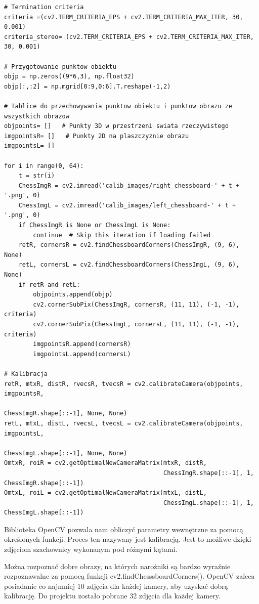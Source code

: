 \documentclass[magisterska]{pracadypl}
\begin{document}
\begin{lstlisting}[style=mypython]
# Termination criteria
criteria =(cv2.TERM_CRITERIA_EPS + cv2.TERM_CRITERIA_MAX_ITER, 30, 0.001)
criteria_stereo= (cv2.TERM_CRITERIA_EPS + cv2.TERM_CRITERIA_MAX_ITER, 30, 0.001)

# Przygotowanie punktow obiektu
objp = np.zeros((9*6,3), np.float32)
objp[:,:2] = np.mgrid[0:9,0:6].T.reshape(-1,2)

# Tablice do przechowywania punktow obiektu i punktow obrazu ze wszystkich obrazow
objpoints= []   # Punkty 3D w przestrzeni swiata rzeczywistego
imgpointsR= []   # Punkty 2D na plaszczyznie obrazu
imgpointsL= []

for i in range(0, 64):
    t = str(i)
    ChessImgR = cv2.imread('calib_images/right_chessboard-' + t + '.png', 0)
    ChessImgL = cv2.imread('calib_images/left_chessboard-' + t + '.png', 0)
    if ChessImgR is None or ChessImgL is None:
        continue  # Skip this iteration if loading failed
    retR, cornersR = cv2.findChessboardCorners(ChessImgR, (9, 6), None)
    retL, cornersL = cv2.findChessboardCorners(ChessImgL, (9, 6), None)
    if retR and retL:
        objpoints.append(objp)
        cv2.cornerSubPix(ChessImgR, cornersR, (11, 11), (-1, -1), criteria)
        cv2.cornerSubPix(ChessImgL, cornersL, (11, 11), (-1, -1), criteria)
        imgpointsR.append(cornersR)
        imgpointsL.append(cornersL)

# Kalibracja
retR, mtxR, distR, rvecsR, tvecsR = cv2.calibrateCamera(objpoints, imgpointsR,
                                                        ChessImgR.shape[::-1], None, None)
retL, mtxL, distL, rvecsL, tvecsL = cv2.calibrateCamera(objpoints, imgpointsL, 
                                                        ChessImgL.shape[::-1], None, None)
OmtxR, roiR = cv2.getOptimalNewCameraMatrix(mtxR, distR, 
                                            ChessImgR.shape[::-1], 1, ChessImgR.shape[::-1])
OmtxL, roiL = cv2.getOptimalNewCameraMatrix(mtxL, distL, 
                                            ChessImgL.shape[::-1], 1, ChessImgL.shape[::-1])
\end{lstlisting}

Biblioteka OpenCV pozwala nam obliczyć parametry wewnętrzne za pomocą określonych funkcji.
Proces ten nazywany jest kalibracją. Jest to możliwe dzięki zdjęciom szachownicy wykonanym pod różnymi kątami.

Można rozpoznać dobre obrazy, na których narożniki są bardzo wyraźnie rozpoznawalne za pomocą funkcji cv2.findChesssboardCorners(). OpenCV zaleca posiadanie co najmniej 10
zdjęcia dla każdej kamery, aby uzyskać dobrą kalibrację. Do projektu zostało pobrane 32 zdjęcia dla każdej kamery.
\end{document}
